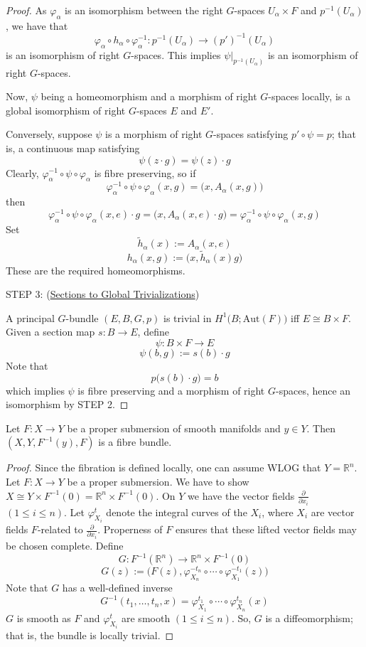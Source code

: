 \documentclass[11pt,a4paper]{article}
\begin{document}
\begin{proof}
As $\varphi_{\alpha}$ is an isomorphism between the right $G$-spaces $U_{\alpha}\times F$ and $p^{-1}(U_{\alpha})$, we have that
$$\varphi_{\alpha}\circ h_{\alpha}\circ \varphi_{\alpha}^{-1}: p^{-1}(U_{\alpha}) \rightarrow (p')^{-1}(U_{\alpha})$$
is an isomorphism of right $G$-spaces. This implies $\psi\big|_{p^{-1}(U_{\alpha})}$ is an isomorphism of right $G$-spaces.


Now, $\psi$ being a homeomorphism and a morphism of right $G$-spaces locally, is a global isomorphism of right $G$-spaces $E$ and $E'$.

Conversely, suppose $\psi$ is a morphism of right $G$-spaces satisfying $p'\circ\psi=p$; that is, a continuous map satisfying $$\psi(z\cdot g) = \psi(z)\cdot g$$ Clearly, $\varphi_{\alpha}^{-1}\circ \psi\circ \varphi_{\alpha}$ is fibre preserving, so if
$$\varphi_{\alpha}^{-1}\circ \psi\circ \varphi_{\alpha}(x, g) = \big(x, A_{\alpha}(x, g)\big)$$
then
$$\varphi_{\alpha}^{-1}\circ \psi\circ \varphi_{\alpha}(x, e)\cdot g = \big(x, A_{\alpha}(x, e)\cdot g\big) = \varphi_{\alpha}^{-1}\circ \psi\circ \varphi_{\alpha}(x, g)$$
Set
$$\widetilde{h}_{\alpha}(x):= A_{\alpha}(x, e)$$
$$h_{\alpha}(x, g) := \big(x, \widetilde{h}_{\alpha}(x)g\big)$$
These are the required homeomorphisms.

STEP 3: (\underline{Sections to Global Trivializations})

A principal $G$-bundle $(E, B, G, p)$ is trivial in $H^{1}\big(B; \text{Aut}(F)\big)$ iff $E\cong B\times F$. Given a section map $s: B \rightarrow E$, define
$$\psi: B\times F \rightarrow E$$
$$\psi(b,g):= s(b)\cdot g$$
Note that
$$p\big(s(b)\cdot g\big) = b$$
which implies $\psi$ is fibre preserving and a morphism of right $G$-spaces, hence an isomorphism by STEP 2.
\end{proof}

\begin{theorem}[Ehresmann]
Let $F: X \rightarrow Y$ be a proper submersion of smooth manifolds and $y \in Y$. Then $(X, Y, F^{-1}(y), F)$ is a fibre bundle.
\end{theorem}
\begin{proof}
Since the fibration is defined locally, one can assume WLOG that $Y= \mathbb{R}^n$. Let $F: X\rightarrow Y$ be a proper submersion. We have to show $X\cong Y\times F^{-1}(0) = \mathbb{R}^n\times F^{-1}(0)$. On $Y$ we have the vector fields $\frac{\partial}{\partial x_i}$ $(1\leq i\leq n)$. Let $\varphi_{X_i}^t$ denote the integral curves of the $X_i$, where $X_i$ are vector fields $F$-related to $\frac{\partial}{\partial x_i}$. Properness of $F$ ensures that these lifted vector fields may be chosen complete. Define
$$G: F^{-1}(\mathbb{R}^n)\rightarrow \mathbb{R}^n\times F^{-1}(0)$$
$$G(z):= \big(F(z), \varphi_{X_n}^{-t_n}\circ\cdots \circ \varphi_{X_1}^{-t_1}(z)\big)$$
Note that $G$ has a well-defined inverse
$$G^{-1}(t_1, \ldots, t_n, x) = \varphi_{X_1}^{t_1}\circ\cdots \circ \varphi_{X_n}^{t_n}(x)$$
$G$ is smooth as $F$ and $\varphi_{X_i}^t$ are smooth $(1\leq i\leq n)$. So, $G$ is a diffeomorphism; that is, the bundle is locally trivial.
\end{proof}
\end{document}

